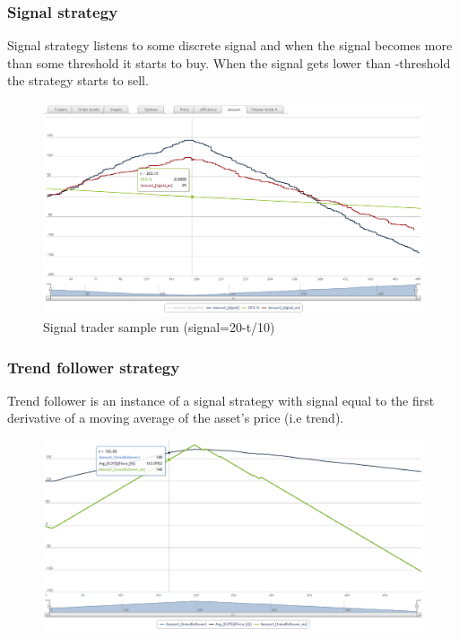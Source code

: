 \documentclass{beamer}
\begin{document}
\begin{frame}
\frametitle{Signal strategy}
Signal strategy listens to some discrete signal and when the signal becomes more than some threshold it starts to buy. When the signal gets lower than -threshold the strategy starts to sell.
\begin{figure}[htbp]
\centering
\includegraphics[width=1\linewidth]{signal.png}
\caption{Signal trader sample run (signal=20-t/10)}
\end{figure}
\end{frame}


\begin{frame}
\frametitle{Trend follower strategy}
Trend follower is an instance of a signal strategy with signal equal to the first derivative of a moving average of the asset's price (i.e trend).
\begin{figure}[htbp]
\centering
\includegraphics[width=1\linewidth]{trendfollower.png}
\end{figure}
\end{frame}

\end{document}
